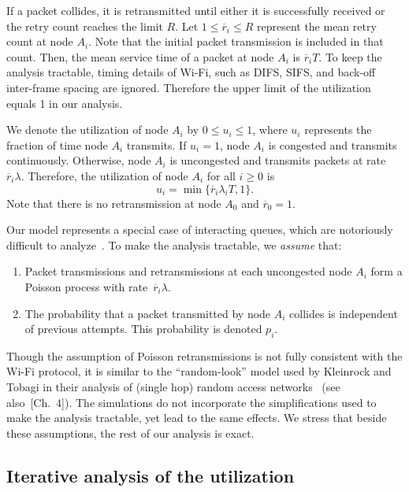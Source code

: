 \documentclass{IEEEtran}
\begin{document}
If a packet collides, it is retransmitted until either it is successfully received or the retry count reaches the limit $R$.  Let $1 \leq \overline{r}_i \leq R$
represent the mean retry count at node $A_i$. Note that the initial packet transmission is included in that count.   Then, the mean service time of a packet at node $A_i$ is $\overline{r}_i T$. To keep the analysis
tractable, timing details of Wi-Fi, such as DIFS, SIFS, and back-off inter-frame spacing are ignored. Therefore the upper limit of the utilization equals 1 in our analysis.

We denote the utilization of node $A_i$ by $0 \leq u_i \leq 1$, where $u_i$ represents the fraction of time node $A_i$ transmits. If $u_i=1$,  node
$A_i$ is congested and transmits continuously. Otherwise, node $A_i$ is uncongested and transmits packets at rate $\overline{r}_i \lambda$.
Therefore, the utilization of node $A_i$ for all $i \geq 0$ is
\begin{equation} \label{definition of utilization}
u_i=\min\{\overline{r}_i \lambda_i T, 1\}.
\end{equation}
Note that there is no retransmission at node $A_0$ and $\overline{r}_0=1$.


Our model represents a special case of interacting queues, which are notoriously difficult to analyze~\cite{Ephremides09}. To make the analysis
tractable, we \emph{assume} that:
\begin{enumerate}
\item Packet transmissions and retransmissions at each uncongested node $A_i$ form a Poisson process with rate~$\overline{r}_i
    \lambda$.\label{poisson arrival}
\item The probability that a packet transmitted by node $A_i$ collides is independent of previous attempts. This probability is denoted
    $p_i$.\label{independence}
\end{enumerate}


Though the assumption of Poisson retransmissions is not fully consistent with the Wi-Fi protocol, it is similar to the ``random-look'' model used by Kleinrock and Tobagi in their analysis of (single hop) random access
networks~\cite{kleinrock1975packet} (see also~\cite{bertsekas1992data}[Ch.\ 4]).
The simulations do not incorporate the simplifications used to make the analysis tractable, yet lead to the same effects.
 We stress that beside these assumptions, the rest of our analysis is exact.



\subsection{Iterative analysis of the utilization}
\label{model}
\end{document}

